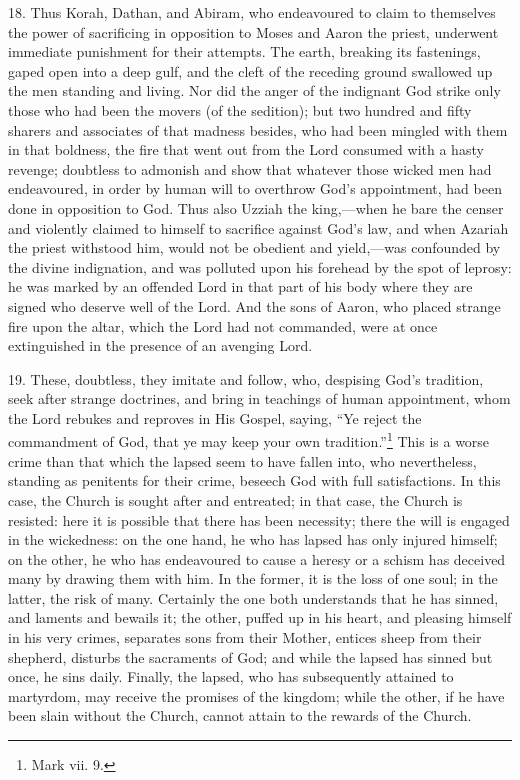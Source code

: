 18. Thus Korah, Dathan, and Abiram, who endeavoured to claim to themselves the power of sacrificing in opposition to Moses and Aaron the priest, underwent immediate punishment for their attempts. The earth, breaking its fastenings, gaped open into a deep gulf, and the cleft of the receding ground swallowed up the men standing and living. Nor did the anger of the indignant God strike only those who had been the movers (of the sedition); but two hundred and fifty sharers and associates of that madness besides, who had been mingled with them in that boldness, the fire that went out from the Lord consumed with a hasty revenge; doubtless to admonish and show that whatever those wicked men had endeavoured, in order by human will to overthrow God’s appointment, had been done in opposition to God. Thus also Uzziah the king,—when he bare the censer and violently claimed to himself to sacrifice against God’s law, and when Azariah the priest withstood him, would not be obedient and yield,—was confounded by the divine indignation, and was polluted upon his forehead by the spot of leprosy: he was marked by an offended Lord in that part of his body where they are signed who deserve well of the Lord. And the sons of Aaron, who placed strange fire upon the altar, which the Lord had not commanded, were at once extinguished in the presence of an avenging Lord.

19. These, doubtless, they imitate and follow, who, despising God’s tradition, seek after strange doctrines, and bring in teachings of human appointment, whom the Lord rebukes and reproves in His Gospel, saying, “Ye reject the commandment of God, that ye may keep your own tradition.”\footnote{Mark vii. 9.} This is a worse crime than that which the lapsed seem to have fallen into, who nevertheless, standing as penitents for their crime, beseech God with full satisfactions. In this case, the Church is sought after and entreated; in that case, the Church is resisted: here it is possible that there has been necessity; there the will is engaged in the wickedness: on the one hand, he who has lapsed has only injured himself; on the other, he who has endeavoured to cause a heresy or a schism has deceived many by drawing them with him. In the former, it is the loss of one soul; in the latter, the risk of many. Certainly the one both understands that he has sinned, and laments and bewails it; the other, puffed up in his heart, and pleasing himself in his very crimes, separates sons from their Mother, entices sheep from their shepherd, disturbs the sacraments of God; and while the lapsed has sinned but once, he sins daily. Finally, the lapsed, who has subsequently attained to martyrdom, may receive the promises of the kingdom; while the other, if he have been slain without the Church, cannot attain to the rewards of the Church.

